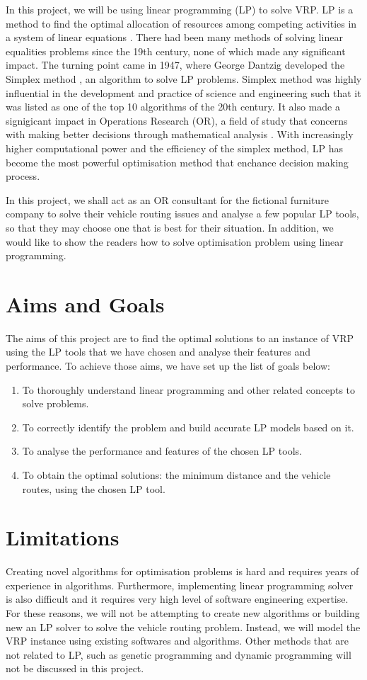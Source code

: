 In this project, we will be using linear programming (LP) to solve VRP. LP is a method to find the optimal allocation
of resources among competing activities in a system of linear equations \cite{APMBradley}. There had been many methods of solving linear equalities
problems since the 19th century, none of which made any significant impact. The turning point came in 1947, where George Dantzig
developed the Simplex method \cite{wiki:SA}, an algorithm to solve LP problems. Simplex method was highly influential
in the development and practice of science and engineering such that it was
listed as one of the top 10 algorithms of the 20th century. It also made a signigicant impact in
 Operations Research (OR), a field of study that concerns with making better decisions through mathematical analysis \cite{wiki:OR}.
 With increasingly higher computational power and
the efficiency of the simplex method, LP has become the most powerful optimisation method that enchance decision making
process.

In this project, we shall act as an OR consultant for the fictional furniture company to solve their vehicle
routing issues and analyse a few popular LP tools, so that they may choose one that is best for their situation.
In addition, we would like to show the readers how to solve optimisation problem using linear programming.

\section{Aims and Goals}
The aims of this project are to find the optimal solutions to an instance of VRP using the LP tools that we have chosen and analyse their features and
performance.
To achieve those aims, we have set up the list of goals below:
\begin{enumerate}
\item To thoroughly understand linear programming and other related concepts to solve problems.
\item To correctly identify the problem and build accurate LP models based on it.
\item To analyse the performance and features of the chosen LP tools.
\item To obtain the optimal solutions: the minimum distance and the vehicle routes, using the chosen LP tool.
\end{enumerate}

\section{Limitations}
Creating novel algorithms for optimisation problems is hard and requires years of experience in algorithms. Furthermore,
implementing linear programming solver is also difficult and it requires very high level of software engineering expertise.
 For these reasons, we will not be attempting to create new algorithms or building new an LP solver to solve
the vehicle routing problem. Instead, we will model the VRP instance using existing softwares and algorithms.
Other methods that are not related to LP, such as genetic programming and dynamic programming will not be discussed in this project.

